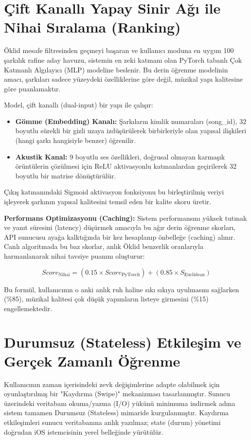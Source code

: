 \documentclass[12pt, a4paper]{report}
\begin{document}
\section{Çift Kanallı Yapay Sinir Ağı ile Nihai Sıralama (Ranking)}

Öklid mesafe filtresinden geçmeyi başaran ve kullanıcı moduna en uygun 100 şarkılık rafine aday havuzu, sistemin en zeki katmanı olan PyTorch tabanlı Çok Katmanlı Algılayıcı (MLP) modeline beslenir. Bu derin öğrenme modelinin amacı, şarkıları sadece yüzeydeki özelliklerine göre değil, müzikal yapı kalitesine göre puanlamaktır.

Model, çift kanallı (dual-input) bir yapı ile çalışır:
\begin{itemize}
    \item \textbf{Gömme (Embedding) Kanalı:} Şarkıların kimlik numaraları (song\_id), 32 boyutlu sürekli bir gizli uzaya izdüşürülerek birbirleriyle olan yapısal ilişkileri (hangi şarkı hangisiyle benzer) öğrenilir.
    \item \textbf{Akustik Kanal:} 9 boyutlu ses özellikleri, doğrusal olmayan karmaşık örüntülerin çözülmesi için ReLU aktivasyonlu katmanlardan geçirilerek 32 boyutlu bir matrise dönüştürülür.
\end{itemize}

Çıkış katmanındaki Sigmoid aktivasyon fonksiyonu bu birleştirilmiş veriyi işleyerek şarkının yapısal kalitesini temsil eden bir kalite skoru üretir.

\textbf{Performans Optimizasyonu (Caching):} Sistem performansını yüksek tutmak ve yanıt süresini (latency) düşürmek amacıyla bu ağır derin öğrenme skorları, API sunucusu ayağa kalktığında bir kez hesaplanıp önbelleğe (caching) alınır. Canlı algoritmada bu baz skorlar, anlık Öklid benzerlik oranlarıyla harmanlanarak nihai tavsiye puanını oluşturur:

$$Score_{\text{Nihai}} = (0.15 \times Score_{\text{PyTorch}}) + (0.85 \times S_{\text{Euclidean}})$$

Bu formül, kullanıcının o anki anlık ruh haline sıkı sıkıya uyulmasını sağlarken (\%85), müzikal kalitesi çok düşük yapımların listeye girmesini (\%15) engellemektedir.

\section{Durumsuz (Stateless) Etkileşim ve Gerçek Zamanlı Öğrenme}

Kullanıcının zaman içerisindeki zevk değişimlerine adapte olabilmek için oyunlaştırılmış bir "Kaydırma (Swipe)" mekanizması tasarlanmıştır. Sunucu üzerindeki veritabanı okuma/yazma (I/O) yükünü minimuma indirmek adına sistem tamamen Durumsuz (Stateless) mimaride kurgulanmıştır. Kaydırma etkileşimleri sunucu veritabanına anlık yazılmaz; state (durum) yönetimi doğrudan iOS istemcisinin yerel belleğinde yürütülür.
\end{document}
